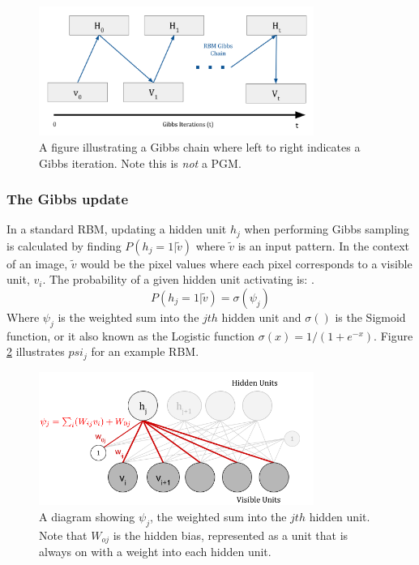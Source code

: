   \begin{figure}[h]
    \begin{center}
      \includegraphics[width=0.8\textwidth]{Assets/RBM-Gibbs-Chain.png}
    \end{center}
    \caption{A figure illustrating a Gibbs chain where left to right indicates a Gibbs iteration. Note this is \emph{not} a PGM.}
    \label{F:Gibbs_Chain}
  \end{figure}

  \subsubsection{The Gibbs update}\label{S:Gibbs-Update}

  In a standard RBM, updating a hidden unit $h_j$ when performing Gibbs sampling is calculated by finding $ P(h_j = 1 | \tilde{v}) $ where $\tilde{v}$ is an input pattern. In the context of an image, $ \tilde{v} $ would be the pixel values where each pixel corresponds to a visible unit, $v_i$.
  The probability of a given hidden unit activating is: .
  \begin{equation}\label{eq:Hid-Gibbs-Update}
  P(h_j = 1 | \tilde{v}) = \sigma(\psi_j)
  \end{equation}
  Where $\psi_j$ is the weighted sum into the $jth$ hidden unit and $\sigma()$ is the Sigmoid function, or it also known as the Logistic function $\sigma(x)=1/(1+e^{-x})$. Figure \ref{F:PSI} illustrates $psi_j$ for an example RBM.

  \begin{figure}[h]
  \begin{center}
    \includegraphics[width = 0.8\textwidth]{Assets/PSI_and_PHI.png}
  \caption{A diagram showing $\psi_j$, the weighted sum into the $jth$ hidden unit. Note that $W_{oj}$ is the hidden bias, represented as a unit that is always on with a weight into each hidden unit.}
  \label{F:PSI}
  \end{center}
  \end{figure}

